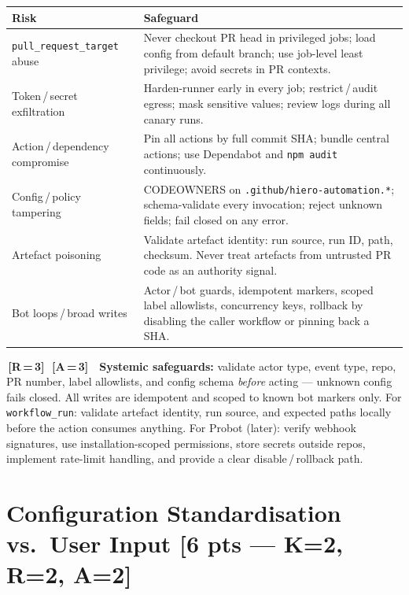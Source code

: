 \documentclass[9pt, a4paper]{article}
\newcommand{\ic}[2]{%
  {\colorbox{tag#1}{\color{white}\bfseries\fontsize{5.5}{6.5}\selectfont\,[#1\,=\,#2]\,}}%
}
\DeclareRobustCommand{\mb}[1]{%
  \texorpdfstring{\hfill{\fontsize{6.5}{7}\selectfont\color{hieroGray}[#1]}}{}%
}
\newcommand{\tsize}{\fontsize{7.8}{9.5}\selectfont}
\begin{document}
\begin{multicols}{2}
\vspace{1pt}
{\tsize
\begin{tabularx}{\linewidth}{@{}L{1.9cm}X@{}}
\toprule
\textbf{Risk} & \textbf{Safeguard} \\
\midrule
\texttt{pull\_request\_target} abuse &
  Never checkout PR head in privileged jobs; load config from default branch; use
  job-level least privilege; avoid secrets in PR contexts. \\
Token\,/\,secret exfiltration &
  Harden-runner early in every job; restrict\,/\,audit egress; mask sensitive values;
  review logs during all canary runs. \\
Action\,/\,dependency compromise &
  Pin all actions by full commit SHA; bundle central actions; use Dependabot and
  \texttt{npm audit} continuously. \\
Config\,/\,policy tampering &
  CODEOWNERS on \texttt{.github/hiero-automation.*}; schema-validate every invocation;
  reject unknown fields; fail closed on any error. \\
Artefact poisoning &
  Validate artefact identity: run source, run ID, path, checksum. Never treat artefacts
  from untrusted PR code as an authority signal. \\
Bot loops\,/\,broad writes &
  Actor\,/\,bot guards, idempotent markers, scoped label allowlists, concurrency keys,
  rollback by disabling the caller workflow or pinning back a SHA. \\
\bottomrule
\end{tabularx}}

\vspace{1pt}
\begin{warnbox}
\fontsize{7.5}{9}\selectfont
\ic{R}{3}\ic{A}{3}\ \textbf{Systemic safeguards:} validate actor type, event type, repo,
PR number, label allowlists, and config schema \emph{before} acting — unknown config
fails closed. All writes are idempotent and scoped to known bot markers only.
For \texttt{workflow\_run}: validate artefact identity, run source, and expected paths
locally before the action consumes anything. For Probot (later): verify webhook signatures,
use installation-scoped permissions, store secrets outside repos, implement rate-limit
handling, and provide a clear disable\,/\,rollback path.
\end{warnbox}

\section{Configuration Standardisation vs.\ User Input \mb{6 pts — K=2, R=2, A=2}}


\end{multicols}
\end{document}
